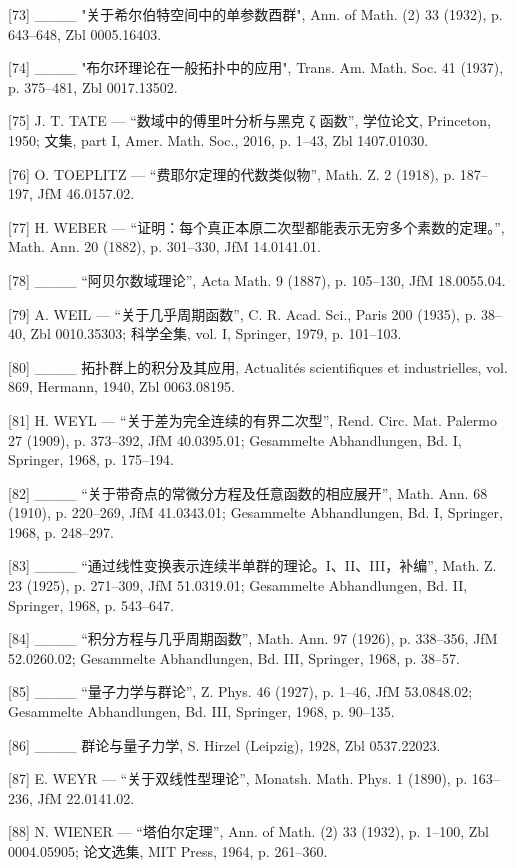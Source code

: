 {[}73{]} \_\_\_\_ "关于希尔伯特空间中的单参数酉群", Ann. of Math. (2) 33 (1932), p. 643--648, Zbl 0005.16403.

{[}74{]} \_\_\_\_ "布尔环理论在一般拓扑中的应用", Trans. Am. Math. Soc. 41 (1937), p. 375--481, Zbl 0017.13502.

{[}75{]} J. T. TATE — “数域中的傅里叶分析与黑克 ζ 函数”, 学位论文, Princeton, 1950; 文集, part I, Amer. Math. Soc., 2016, p. 1–43, Zbl 1407.01030.

{[}76{]} O. TOEPLITZ — “费耶尔定理的代数类似物”, Math. Z. 2 (1918), p. 187–197, JfM 46.0157.02.

{[}77{]} H. WEBER — “证明：每个真正本原二次型都能表示无穷多个素数的定理。”, Math. Ann. 20 (1882), p. 301–330, JfM 14.0141.01.

{[}78{]} \_\_\_\_ “阿贝尔数域理论”, Acta Math. 9 (1887), p. 105–130, JfM 18.0055.04.

{[}79{]} A. WEIL — “关于几乎周期函数”, C. R. Acad. Sci., Paris 200 (1935), p. 38–40, Zbl 0010.35303; 科学全集, vol. I, Springer, 1979, p. 101–103.

{[}80{]} \_\_\_\_ 拓扑群上的积分及其应用, Actualités scientifiques et industrielles, vol. 869, Hermann, 1940, Zbl 0063.08195.

{[}81{]} H. WEYL — “关于差为完全连续的有界二次型”, Rend. Circ. Mat. Palermo 27 (1909), p. 373–392, JfM 40.0395.01; Gesammelte Abhandlungen, Bd. I, Springer, 1968, p. 175–194.

{[}82{]} \_\_\_\_ “关于带奇点的常微分方程及任意函数的相应展开”, Math. Ann. 68 (1910), p. 220–269, JfM 41.0343.01; Gesammelte Abhandlungen, Bd. I, Springer, 1968, p. 248–297.

{[}83{]} \_\_\_\_ “通过线性变换表示连续半单群的理论。I、II、III，补编”, Math. Z. 23 (1925), p. 271–309, JfM 51.0319.01; Gesammelte Abhandlungen, Bd. II, Springer, 1968, p. 543–647.

{[}84{]} \_\_\_\_ “积分方程与几乎周期函数”, Math. Ann. 97 (1926), p. 338–356, JfM 52.0260.02; Gesammelte Abhandlungen, Bd. III, Springer, 1968, p. 38–57.

{[}85{]} \_\_\_\_ “量子力学与群论”, Z. Phys. 46 (1927), p. 1–46, JfM 53.0848.02; Gesammelte Abhandlungen, Bd. III, Springer, 1968, p. 90–135.

{[}86{]} \_\_\_\_ 群论与量子力学, S. Hirzel (Leipzig), 1928, Zbl 0537.22023.

{[}87{]} E. WEYR — “关于双线性型理论”, Monatsh. Math. Phys. 1 (1890), p. 163–236, JfM 22.0141.02.

{[}88{]} N. WIENER — “塔伯尔定理”, Ann. of Math. (2) 33 (1932), p. 1–100, Zbl 0004.05905; 论文选集, MIT Press, 1964, p. 261–360.

